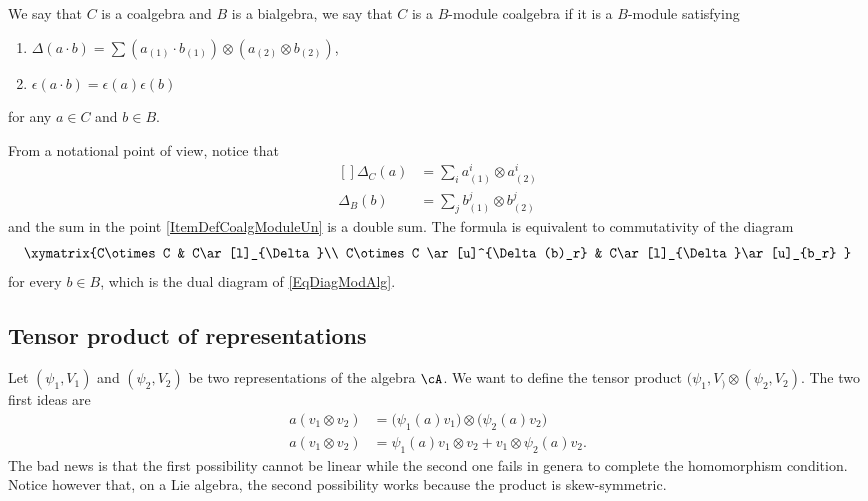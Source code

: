 \begin{definition}
	We say that $C$ is a coalgebra and $B$ is a bialgebra, we say that $C$ is a $B$-module coalgebra if it is a $B$-module satisfying
	\begin{enumerate}

		\item\label{ItemDefCoalgModuleUn}
			$\Delta(a\cdot b)=\sum (a_{(1)}\cdot b_{(1)})\otimes (a_{(2)}\otimes b_{(2)})$,
		\item
			$\epsilon(a\cdot b)=\epsilon(a)\epsilon(b)$

	\end{enumerate}
	for any $a\in C$ and $b\in B$.
\end{definition}
From a notational point of view, notice that
\begin{equation}
	\begin{aligned}[]
		\Delta_C(a)&=\sum_ia_{(1)}^i\otimes a_{(2)}^i\\
		\Delta_B(b)&=\sum_jb_{(1)}^j\otimes b_{(2)}^j
	\end{aligned}
\end{equation}
and the sum in the point \ref{ItemDefCoalgModuleUn} is a double sum. The formula is equivalent to commutativity of the diagram
\begin{equation}	\label{EqDiagModCoAlg}
	\xymatrix{%
	C\otimes C 		&	C\ar[l]_{\Delta}\\
	C\otimes C \ar[u]^{\Delta(b)_r}	&	C\ar[l]_{\Delta}\ar[u]_{b_r}
	   }
\end{equation}
for every $b\in B$, which is the dual diagram of \eqref{EqDiagModAlg}.

\subsection{Tensor product of representations}

Let $(\psi_1,V_1)$ and $(\psi_2,V_2)$ be two representations of the algebra $\cA$. We want to define the tensor product $(\psi_1,V_)\otimes(\psi_2,V_2)$. The two first ideas are
\begin{subequations}
\begin{align}
a(v_1\otimes v_2)&=\big( \psi_1(a)v_1 \big)\otimes\big( \psi_2(a)v_2 \big)\\
a(v_1\otimes v_2)&=\psi_1(a)v_1\otimes v_2+v_1\otimes \psi_2(a)v_2.
\end{align}
\end{subequations}
The bad news is that the first possibility cannot be linear while the second one fails in genera to complete the homomorphism condition. Notice however that, on a Lie algebra, the second possibility works because the product is skew-symmetric. 

